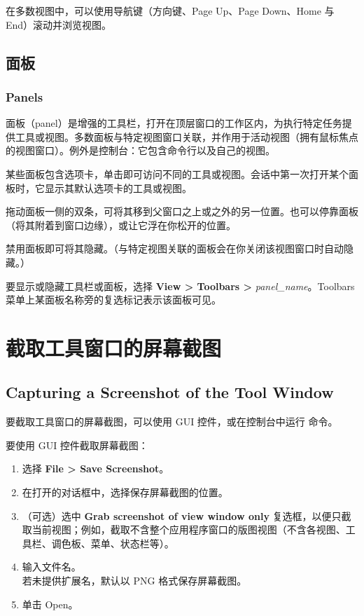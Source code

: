 在多数视图中，可以使用导航键（方向键、Page Up、Page Down、Home 与 End）滚动并浏览视图。

\subsection{面板}
\subsubsection*{Panels}

面板（panel）是增强的工具栏，打开在顶层窗口的工作区内，为执行特定任务提供工具或视图。多数面板与特定视图窗口关联，并作用于活动视图（拥有鼠标焦点的视图窗口）。例外是控制台：它包含命令行以及自己的视图。

某些面板包含选项卡，单击即可访问不同的工具或视图。会话中第一次打开某个面板时，它显示其默认选项卡的工具或视图。

拖动面板一侧的双条，可将其移到父窗口之上或之外的另一位置。也可以停靠面板（将其附着到窗口边缘），或让它浮在你松开的位置。

禁用面板即可将其隐藏。（与特定视图关联的面板会在你关闭该视图窗口时自动隐藏。）

要显示或隐藏工具栏或面板，选择 \textbf{View > Toolbars >} \textit{panel\_name}。Toolbars 菜单上某面板名称旁的复选标记表示该面板可见。

\section{截取工具窗口的屏幕截图}
\subsection*{Capturing a Screenshot of the Tool Window}

要截取工具窗口的屏幕截图，可以使用 GUI 控件，或在控制台中运行  命令。

要使用 GUI 控件截取屏幕截图：
\begin{enumerate}
  \item 选择 \textbf{File > Save Screenshot}。
  \item 在打开的对话框中，选择保存屏幕截图的位置。
  \item （可选）选中 \textbf{Grab screenshot of view window only} 复选框，以便只截取当前视图；例如，截取不含整个应用程序窗口的版图视图（不含各视图、工具栏、调色板、菜单、状态栏等）。
  \item 输入文件名。\\
        若未提供扩展名，默认以 PNG 格式保存屏幕截图。
  \item 单击 Open。
\end{enumerate}

